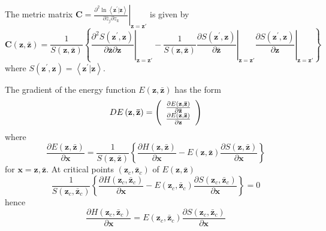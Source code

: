 \documentclass[aps,preprint]{revtex4}%
\begin{document}
The metric matrix $\mathbf{C}=\left.  \frac{\partial^{2}\ln\left\langle
\mathbf{z}^{\prime}|\mathbf{z}\right\rangle }{\partial\bar{z}_{j}\partial
z_{k}}\right\vert _{\mathbf{z=z\prime}}$ is given by
\begin{equation}
\mathbf{C}\left(  \mathbf{z},\mathbf{\bar{z}}\right)  =\frac{1}{S\left(
\mathbf{z},\mathbf{\bar{z}}\right)  }\left\{  \left.  \frac{\partial
^{2}S\left(  \mathbf{z}^{\prime},\mathbf{z}\right)  }{\partial\mathbf{\bar{z}%
}\partial\mathbf{z}}\right\vert _{\mathbf{z=z\prime}}-\frac{1}{S\left(
\mathbf{z},\mathbf{\bar{z}}\right)  }\left.  \frac{\partial S\left(
\mathbf{z}^{\prime},\mathbf{z}\right)  }{\partial\mathbf{\bar{z}}}\right\vert
_{\mathbf{z=z\prime}}\left.  \frac{\partial S\left(  \mathbf{z}^{\prime
},\mathbf{z}\right)  }{\partial\mathbf{z}}\right\vert _{\mathbf{z=z\prime}%
}\right\}
\end{equation}
where $S\left(  \mathbf{z}^{\prime},\mathbf{z}\right)  =\left\langle
\mathbf{z}^{\prime}|\mathbf{z}\right\rangle $.

The gradient of the energy function $E\left(  \mathbf{z},\mathbf{\bar{z}%
}\right)  $ has the form%
\begin{equation}
DE\left(  \mathbf{z},\mathbf{\bar{z}}\right)  =\left(
\begin{array}
[c]{c}%
\frac{\partial E\left(  \mathbf{z},\mathbf{\bar{z}}\right)  }{\partial
\mathbf{\bar{z}}}\\
\frac{\partial E\left(  \mathbf{z},\mathbf{\bar{z}}\right)  }{\partial
\mathbf{z}}%
\end{array}
\right)
\end{equation}
where
\begin{equation}
\frac{\partial E\left(  \mathbf{z},\mathbf{\bar{z}}\right)  }{\partial
\mathbf{x}}=\frac{1}{S\left(  \mathbf{z},\mathbf{\bar{z}}\right)  }\left\{
\frac{\partial H\left(  \mathbf{z},\mathbf{\bar{z}}\right)  }{\partial
\mathbf{x}}-E\left(  \mathbf{z},\mathbf{\bar{z}}\right)  \frac{\partial
S\left(  \mathbf{z},\mathbf{\bar{z}}\right)  }{\partial\mathbf{x}}\right\}
\end{equation}
for $\mathbf{x=z,\bar{z}}$. At critical points $\left(  \mathbf{z}%
_{c},\mathbf{\bar{z}}_{c}\right)  $ of $E\left(  \mathbf{z},\mathbf{\bar{z}%
}\right)  $
\begin{equation}
\frac{1}{S\left(  \mathbf{z}_{c},\mathbf{\bar{z}}_{c}\right)  }\left\{
\frac{\partial H\left(  \mathbf{z}_{c},\mathbf{\bar{z}}_{c}\right)  }%
{\partial\mathbf{x}}-E\left(  \mathbf{z}_{c},\mathbf{\bar{z}}_{c}\right)
\frac{\partial S\left(  \mathbf{z}_{c},\mathbf{\bar{z}}_{c}\right)  }%
{\partial\mathbf{x}}\right\}  =0
\end{equation}
hence
\begin{equation}
\frac{\partial H\left(  \mathbf{z}_{c},\mathbf{\bar{z}}_{c}\right)  }%
{\partial\mathbf{x}}=E\left(  \mathbf{z}_{c},\mathbf{\bar{z}}_{c}\right)
\frac{\partial S\left(  \mathbf{z}_{c},\mathbf{\bar{z}}_{c}\right)  }%
{\partial\mathbf{x}}%
\end{equation}
\end{document}
